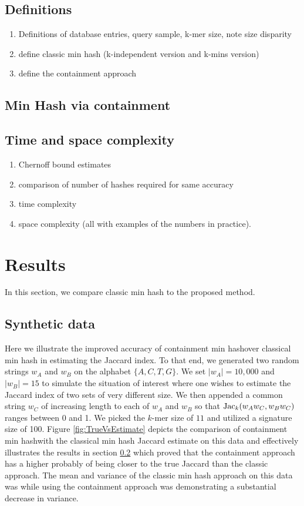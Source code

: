 \documentclass[11pt]{amsart}
\theoremstyle{remark}
\numberwithin{equation}{section}
\newcommand{\themethod}{containment min hash}
\DeclareMathOperator{\Jac}{{\rm Jac}}
\begin{document}
\subsection{Definitions}
\begin{enumerate}
\item Definitions of database entries, query sample, k-mer size, note size disparity
\item define classic min hash (k-independent version and k-mins version)
\item define the containment approach
\end{enumerate}
\subsection{Min Hash via containment}
\label{section:ChernoffBounds}
\subsection{Time and space complexity}
\begin{enumerate}
\item Chernoff bound estimates
\item comparison of number of hashes required for same accuracy
\item time complexity
\item space complexity (all with examples of the numbers in practice).
\end{enumerate}


\section{Results}
In this section, we compare classic min hash to the proposed method.
\subsection{Synthetic data}
\label{section:SyntheticData}
Here we illustrate the improved accuracy of \themethod over classical min hash in estimating the Jaccard index. To that end, we generated two random strings $w_A$ and $w_B$ on the alphabet $\{A,C,T,G\}$. We set $|w_A|= 10,000$ and $|w_B| = 15$ to simulate the situation of interest where one wishes to estimate the Jaccard index of two sets of very different size. We then appended a common string $w_C$ of increasing length to each of $w_A$ and $w_B$ so that $\Jac_k(w_Aw_C, w_Bw_C)$ ranges between 0 and 1. We picked the $k$-mer size of $11$ and utilized a signature size of 100. Figure \ref{fig:TrueVsEstimate} depicts the comparison of \themethod with the classical min hash Jaccard estimate on this data and effectively illustrates the results in section \ref{section:ChernoffBounds} which proved that the containment approach has a higher probably of being closer to the true Jaccard than the classic approach. The mean and variance of the classic min hash approach on this data was while using the containment approach was demonstrating a substantial decrease in variance.
\end{document}
